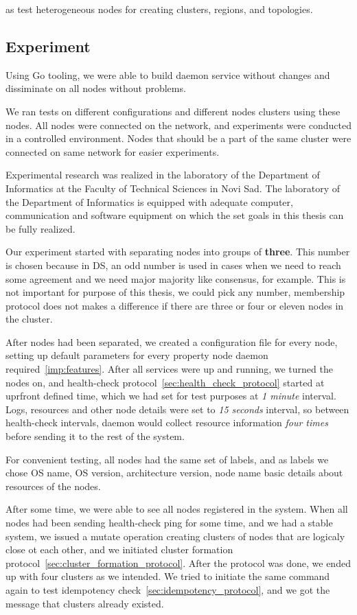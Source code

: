 \noindent
as test heterogeneous nodes for creating clusters, regions, and topologies.
%
%
\subsection{Experiment}\label{sec:experiment}
%
Using Go tooling, we were able to build daemon service without changes and dissiminate on all nodes without problems.

We ran tests on different configurations and different nodes clusters using these nodes. All nodes were connected on the network, and experiments were conducted in a controlled environment. Nodes that should be a part of the same cluster were connected on same network for easier experiments.

Experimental research was realized in the laboratory of the Department of Informatics at the Faculty of Technical Sciences in Novi Sad. The laboratory of the Department of Informatics is equipped with adequate computer, communication and software equipment on which the set goals in this thesis can be fully realized.

Our experiment started with separating nodes into groups of \textbf{three}. This number is chosen because in DS, an odd number is used in cases when we need to reach some agreement and we need major majority like consensus, for example. This is not important for purpose of this thesis, we could pick any number, membership protocol does not makes a difference if there are three or four or eleven nodes in the cluster.

After nodes had been separated, we created a configuration file for every node, setting up default parameters for every property node daemon required~\ref{imp:features}. After all services were up and running, we turned the nodes on, and health-check protocol~\ref{sec:health_check_protocol} started at uprfront defined time, which we had set for test purposes at \emph{1 minute} interval. Logs, resources and other node details were set to \emph{15 seconds} interval, so between health-check intervals, daemon would collect resource information \emph{four times} before sending it to the rest of the system.

For convenient testing, all nodes had the same set of labels, and as labels we chose OS name, OS version, architecture version, node name basic details about resources of the nodes.

After some time, we were able to see all nodes registered in the system. When all nodes had been sending health-check ping for some time, and we had a stable system, we issued a mutate operation creating clusters of nodes that are logicaly close ot each other, and we initiated cluster formation protocol~\ref{sec:cluster_formation_protocol}. After the protocol was done, we ended up with four clusters as we intended. We tried to initiate the same command again to test idempotency check~\ref{sec:idempotency_protocol}, and we got the message that clusters already existed.

